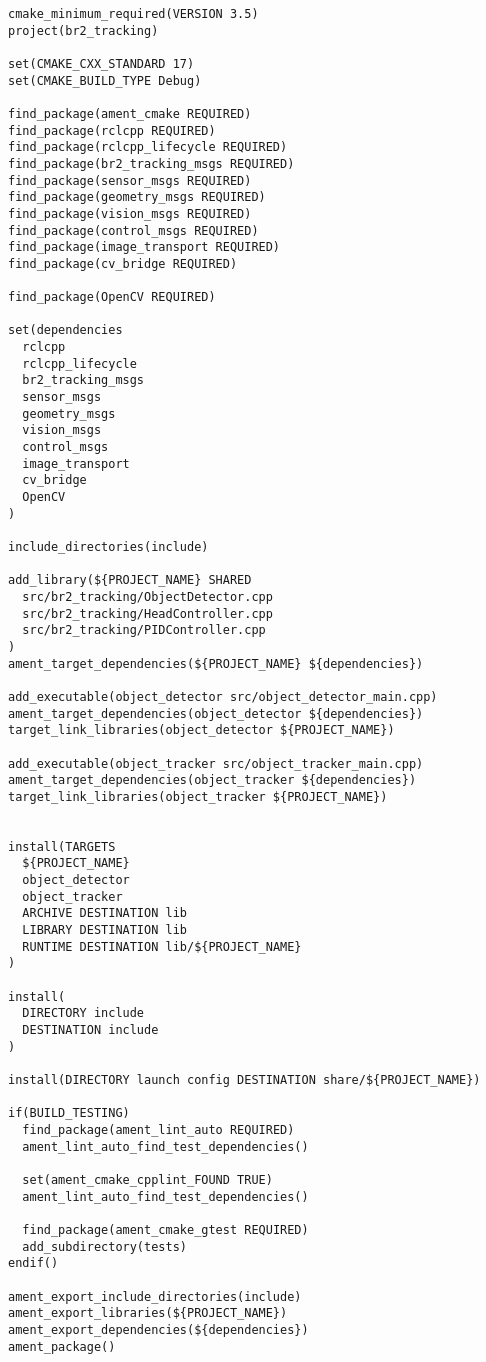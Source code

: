  \footnotesize
\begin{tcolorbox}[sharp corners, colframe=gray!80, colback=LightGray, left=0pt, top=0pt, bottom=0pt, title=\texttt{br2\_tracking/CMakeLists.txt}]
  \begin{verbatim}
cmake_minimum_required(VERSION 3.5)
project(br2_tracking)

set(CMAKE_CXX_STANDARD 17)
set(CMAKE_BUILD_TYPE Debug)

find_package(ament_cmake REQUIRED)
find_package(rclcpp REQUIRED)
find_package(rclcpp_lifecycle REQUIRED)
find_package(br2_tracking_msgs REQUIRED)
find_package(sensor_msgs REQUIRED)
find_package(geometry_msgs REQUIRED)
find_package(vision_msgs REQUIRED)
find_package(control_msgs REQUIRED)
find_package(image_transport REQUIRED)
find_package(cv_bridge REQUIRED)

find_package(OpenCV REQUIRED)

set(dependencies
  rclcpp
  rclcpp_lifecycle
  br2_tracking_msgs
  sensor_msgs
  geometry_msgs
  vision_msgs
  control_msgs
  image_transport
  cv_bridge
  OpenCV
)

include_directories(include)

add_library(${PROJECT_NAME} SHARED
  src/br2_tracking/ObjectDetector.cpp
  src/br2_tracking/HeadController.cpp
  src/br2_tracking/PIDController.cpp
)
ament_target_dependencies(${PROJECT_NAME} ${dependencies})

add_executable(object_detector src/object_detector_main.cpp)
ament_target_dependencies(object_detector ${dependencies})
target_link_libraries(object_detector ${PROJECT_NAME})

add_executable(object_tracker src/object_tracker_main.cpp)
ament_target_dependencies(object_tracker ${dependencies})
target_link_libraries(object_tracker ${PROJECT_NAME})


install(TARGETS
  ${PROJECT_NAME}
  object_detector
  object_tracker
  ARCHIVE DESTINATION lib
  LIBRARY DESTINATION lib
  RUNTIME DESTINATION lib/${PROJECT_NAME}
)

install(
  DIRECTORY include
  DESTINATION include
)

install(DIRECTORY launch config DESTINATION share/${PROJECT_NAME})

if(BUILD_TESTING)
  find_package(ament_lint_auto REQUIRED)
  ament_lint_auto_find_test_dependencies()

  set(ament_cmake_cpplint_FOUND TRUE)
  ament_lint_auto_find_test_dependencies()

  find_package(ament_cmake_gtest REQUIRED)
  add_subdirectory(tests)
endif()

ament_export_include_directories(include)
ament_export_libraries(${PROJECT_NAME})
ament_export_dependencies(${dependencies})
ament_package()
    \end{verbatim}
    \end{tcolorbox}
  \normalsize


